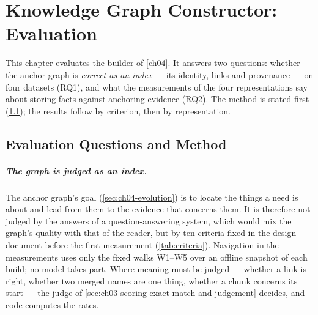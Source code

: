\chapter{Knowledge Graph Constructor: Evaluation}\label{ch05}

This chapter evaluates the builder of \cref{ch04}. It answers two questions: whether the anchor graph is
\emph{correct as an index} --- its identity, links and provenance --- on four datasets (RQ1), and what the
measurements of the four representations say about storing facts against anchoring evidence (RQ2). The method is
stated first (\cref{sec:ch05-method}); the results follow by criterion, then by representation.

\section{Evaluation Questions and Method}\label{sec:ch05-method}

\paragraph{The graph is judged as an index.} The anchor graph's goal (\cref{sec:ch04-evolution}) is to locate
the things a need is about and lead from them to the evidence that concerns them. It is therefore not judged
by the answers of a question-answering system, which would mix the graph's quality with that of the reader, but
by ten criteria fixed in the design document before the first measurement (\cref{tab:criteria}). Navigation in
the measurements uses only the fixed walks W1--W5 over an offline snapshot of each build; no model takes part.
Where meaning must be judged --- whether a link is right, whether two merged names are one thing, whether a chunk
concerns its start --- the judge of \cref{sec:ch03-scoring-exact-match-and-judgement} decides, and code computes
the rates.

